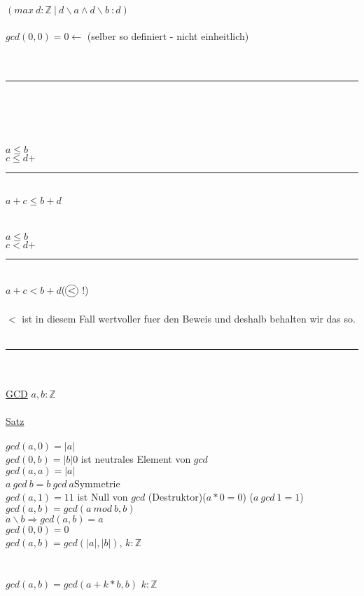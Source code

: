 \documentclass[18pt,a4paper]{article}
\newcommand*\circled[1]{\tikz[baseline=(char.base)]{
            \node[shape=circle,draw,inner sep=1pt] (char) {#1};}}
\newcommand{\tab}{\hspace*{2em}}
\begin{document}
\\
$(max\: d: \mathbb{Z} \:\vert\: d\backslash a \wedge d\backslash b\ : d)$\\
\\
$gcd(0,0) = 0 \leftarrow$ (selber so definiert - nicht einheitlich)\\
\\
\\
\rule{\textwidth}{0.4mm}\\
\\
\\
\\
$a\leqslant b$\\
$c\leqslant d$\tab $+$\\
\rule{2cm}{0.2mm}\\
$a+c\leqslant b+d$\\
\\
\\
$a\leqslant b$\\
$c < d$\tab $+$\\
\rule{2cm}{0.2mm}\\
$a+c < b+d$\tab ($\circled{$<$}$ !)\\
\\
$<$ ist in diesem Fall wertvoller fuer den Beweis und deshalb behalten wir das so.
\\
\\
\rule{\textwidth}{0.4mm}\\
\\
\uline{GCD} $a,b:\mathbb{Z}$\\
\\
\uline{Satz}\\
\\
$gcd(a,0) = |a|$\\
$gcd(0,b) = |b|$\tab $0$ ist neutrales Element von $gcd$\\
$gcd(a,a) = |a|$\\
$a\: gcd \: b = b\: gcd \: a$\tab Symmetrie\\
$gcd(a,1) = 1$\tab $1$ ist Null von $gcd$ (Destruktor)\tab \tab ($a * 0 = 0$) ($a\: gcd \: 1 = 1$)\\
$gcd(a,b) = gcd(a\: mod\: b,b)$\\
$a\backslash b \Rightarrow gcd(a,b) = a$\\
$gcd(0,0) = 0$\\
$gcd(a,b) = gcd(|a|,|b|)$, $k:\mathbb{Z}$\\
\\
\\
$gcd(a,b) = gcd(a+k*b,b)$ \tab $k:\mathbb{Z}$\\
\end{document}
